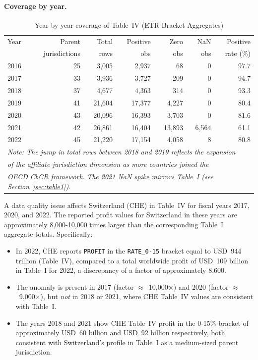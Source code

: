 \documentclass[11pt,a4paper]{article}
\newcommand{\code}[1]{\texttt{#1}}
\begin{document}
\paragraph{Coverage by year.}
\begin{table}[H]
\centering
\caption{Year-by-year coverage of Table~IV (ETR Bracket Aggregates)}
\label{tab:t4yearcoverage}
\begin{tabular}{@{}lrrrrrr@{}}
\toprule
Year & Parent & Total  & Positive & Zero & NaN & Positive \\
     & jurisdictions & rows & obs & obs & obs & rate (\%) \\
\midrule
2016 & 25 &  3,005 &  2,937 &     68 &    0 & 97.7 \\
2017 & 33 &  3,936 &  3,727 &    209 &    0 & 94.7 \\
2018 & 37 &  4,677 &  4,363 &    314 &    0 & 93.3 \\
2019 & 41 & 21,604 & 17,377 &  4,227 &    0 & 80.4 \\
2020 & 43 & 20,096 & 16,393 &  3,703 &    0 & 81.6 \\
2021 & 42 & 26,861 & 16,404 & 13,893 & 6,564 & 61.1 \\
2022 & 45 & 21,220 & 17,154 &  4,058 &    8 & 80.8 \\
\midrule
\multicolumn{7}{l}{\small\textit{Note: The jump in total rows between 2018 and 2019 reflects the expansion}} \\
\multicolumn{7}{l}{\small\textit{of the affiliate jurisdiction dimension as more countries joined the}} \\
\multicolumn{7}{l}{\small\textit{OECD CbCR framework. The 2021 NaN spike mirrors Table~I (see Section~\ref{sec:table1}).}} \\
\bottomrule
\end{tabular}
\end{table}

A data quality issue affects Switzerland (CHE) in Table~IV for fiscal years 2017, 2020, and 2022. The reported profit values for Switzerland in these years are approximately 8,000-10,000 times larger than the corresponding Table~I aggregate totals. Specifically:

\begin{itemize}
    \item In 2022, CHE reports \code{PROFIT} in the \code{RATE\_0-15} bracket
          equal to USD~944 trillion (Table~IV), compared to a total worldwide
          profit of USD~109 billion in Table~I for 2022, a discrepancy of a
          factor of approximately 8,600.
    \item The anomaly is present in 2017 (factor $\approx$~10,000$\times$)
          and 2020 (factor $\approx$~9,000$\times$), but \emph{not} in
          2018 or 2021, where CHE Table~IV values are consistent with Table~I.
    \item The years 2018 and 2021 show CHE Table~IV profit in the 0-15\%
          bracket of approximately USD~60 billion and USD~92 billion
          respectively, both consistent with Switzerland's profile in Table~I
          as a medium-sized parent jurisdiction.
\end{itemize}
\end{document}
